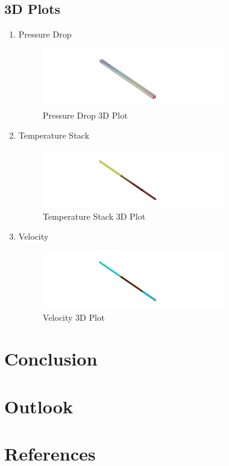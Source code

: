 \documentclass{report}
\begin{document}
            \subsection{3D Plots}
                \begin{enumerate}
                    \item Pressure Drop
                        \begin{figure}[H]
                            \centering
                            \includegraphics[width=0.75\textwidth]{00_Images/00_Pressure.png}
                            \caption{Pressure Drop 3D Plot}
                        \end{figure}
                    \item Temperature Stack
                        \begin{figure}[H]
                            \centering
                            \includegraphics[width=0.75\textwidth]{00_Images/00_Temperature.png}
                            \caption{Temperature Stack 3D Plot}
                        \end{figure}
                    \item Velocity 
                        \begin{figure}
                            \centering
                            \includegraphics[width=0.75\textwidth]{00_Images/00_Velocity.png}
                            \caption{Velocity 3D Plot}
                        \end{figure}
                \end{enumerate}





\section{Conclusion}
\section{Outlook}
\section{References}
\end{document}
